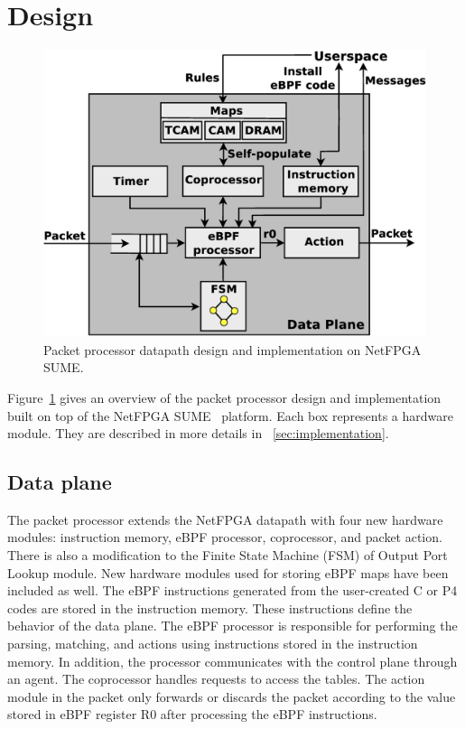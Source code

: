 \section{\system Design}
\label{sec:design}

\begin{figure}[t]
\centering
\includegraphics[width=1.\linewidth]{figures/06_fig01.eps}
\caption{Packet processor datapath design and implementation on NetFPGA SUME.}
\label{fig:06_fig01}
\end{figure}

Figure~\ref{fig:06_fig01} gives an overview of the packet processor design and implementation built on top of the NetFPGA SUME~\cite{SUME2014} platform. 
Each box represents a hardware module.
They are described in more details in \textsection~\ref{sec:implementation}.


\subsection{Data plane}

The packet processor extends the NetFPGA datapath with four new hardware modules: instruction memory, eBPF processor, coprocessor, and packet action. There is also a modification to the Finite State Machine (FSM) of Output Port Lookup module.
New hardware modules used for storing eBPF maps have been included as well. %
The eBPF instructions generated from the user-created C or P4 codes are stored in the instruction memory. These instructions define the behavior of the data plane. The eBPF processor is responsible for performing the parsing, matching, and actions using instructions stored in the instruction memory. In addition, the processor communicates with the control plane through an agent. The coprocessor handles requests to access the tables. The action module in the packet only forwards or discards the packet according to the value stored in eBPF register R0 after processing the eBPF instructions. %

